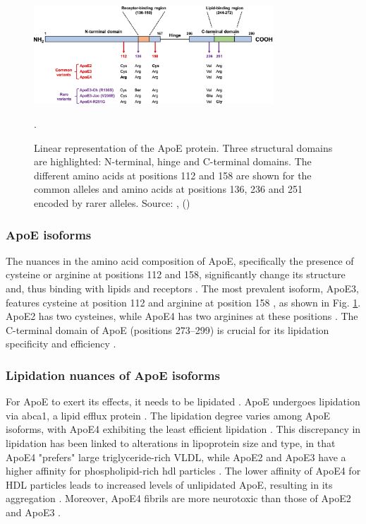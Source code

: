 \documentclass{amsart}
\begin{document}
\begin{figure}[htb]
  \includegraphics[width=0.8\textwidth]{figures/ApoEprot.png}
    \caption{Linear representation of the ApoE protein. Three structural domains are highlighted: N-terminal, hinge and C-terminal domains. The different amino acids at positions 112 and 158 are shown for the common alleles and amino acids at positions 136, 236 and 251 encoded by rarer alleles. Source: ,  (\citeyear{Bu2022APOEVariants}) \cite{Bu2022APOEVariants}}.
  \label{fig2}
\end{figure}

\subsubsection{ApoE isoforms}
The nuances in the amino acid composition of ApoE, specifically the presence of cysteine or arginine at positions 112 and 158, significantly change its structure and, thus binding with lipids and receptors \cite{Yassine2020APOEDisease}. The most prevalent isoform, ApoE3, features cysteine at position 112 and arginine at position 158  \cite{Yassine2020APOEDisease}, as shown in Fig. \ref{fig2}. ApoE2 has two cysteines, while ApoE4 has two arginines at these positions \cite{Yassine2020APOEDisease}. The C-terminal domain of ApoE (positions 273–299) is crucial for its lipidation specificity and efficiency \cite{Hu2015OpposingMice}.

\subsubsection{Lipidation nuances of ApoE isoforms}
For ApoE to exert its effects, it needs to be lipidated \cite{Husain2021APOETherapeutics}. ApoE undergoes lipidation via \acrfull{abca1}, a lipid efflux protein \cite{Flowers2020APOEBrain, Courtney2016LXRDisease}. The lipidation degree varies among ApoE isoforms, with ApoE4 exhibiting the least efficient lipidation \cite{Hu2015OpposingMice, Heinsinger2016ApolipoproteinFluid}. This discrepancy in lipidation has been linked to alterations in lipoprotein size and type, in that ApoE4 "prefers" large triglyceride-rich VLDL, while ApoE2 and ApoE3 have a higher affinity for phospholipid-rich \acrshort{hdl} particles \cite{Nguyen2010MolecularE4}. The lower affinity of ApoE4 for HDL particles leads to increased levels of unlipidated ApoE, resulting in its aggregation \cite{Hatters2006ApolipoproteinFunction}. Moreover, ApoE4 fibrils are more neurotoxic than those of ApoE2 and ApoE3 \cite{Hatters2006Amino-terminalFibrils}.
\end{document}
